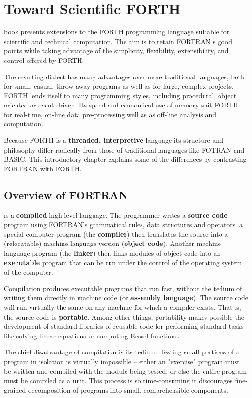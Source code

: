 \chapter{Toward Scientific FORTH}
 book presents extensions to the FORTH programming language suitable for scientific and technical computation. The aim is to retain FORTRAN s good points while taking advantage of the simplicity, flexibility, extensibility, and control offered by FORTH.

The resulting dialect has many advantages over more traditional languages, both for small, casual, throw-away programs as well as for large, complex projects. FORTH lends itself to many programming styles, including procedural, object oriented or event-driven. Its speed and economical use of memory suit FORTH for real-time, on-line data pre-processing well as as off-line analysis and computation.

Because FORTH is a \textbf{threaded, interpretive} language its  structure and philosophy differ radically from those of traditional languages like FOTRAN and BASIC. This introductory chapter explains some of the differences by contrasting FORTRAN with FORTH.

\section{Overview of FORTRAN}
 is a \textbf{compiled} high level language. The programmer writes a \textbf{source code} program using FORTRAN's grammatical rules, data structures and operators; a special computer program (the \textbf{compiler}) then translates the source into a (relocatable) machine language version (\textbf{object code}). Another machine language program (the \textbf{linker}) then links modules of object code into an \textbf{executable} program that can be run under the control of the operating system of the computer.

Compilation produces executable programs that run fast, without the tedium of writing them directly in machine code (or \textbf{assembly language}). The source code will run virtually the same on any machine for which a compiler exists. That is, the source code is \textbf{portable}. Among other things, portability makes possible the development of standard libraries of reusable code for performing standard tasks like solving linear equations or computing Bessel functions.

The chief disadvantage of compilation is its tedium. Testing small portions of a program in isolation is virtually impossible -- either an "exercise" program must be written and compiled with the module being tested, or else the entire program must be compiled as a unit. This process is so time-consuming it discourages fine-grained decomposition of programs into small, comprehensible components.
 
